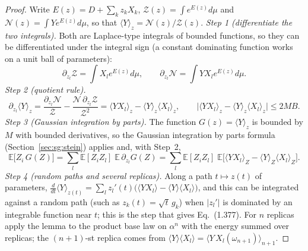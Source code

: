 \begin{proof}
\leanok
Write $E(z)=D+\sum_kz_kX_k$, $\mathcal Z(z)=\int e^{E(z)}d\mu$ and $\mathcal N(z)=\int Y e^{E(z)}d\mu$, so that $\langle Y\rangle_z=\mathcal N(z)/\mathcal Z(z)$.
\emph{Step 1 (differentiate the two integrals).} Both are Laplace-type integrals of bounded functions, so they can be differentiated under the integral sign (a constant dominating function works on a unit ball of parameters):
\[
\partial_{z_l}\mathcal Z=\int X_le^{E(z)}d\mu,\qquad \partial_{z_l}\mathcal N=\int YX_le^{E(z)}d\mu .
\]
\emph{Step 2 (quotient rule).}
\[
\partial_{z_l}\langle Y\rangle_z=\frac{\partial_{z_l}\mathcal N}{\mathcal Z}-\frac{\mathcal N\,\partial_{z_l}\mathcal Z}{\mathcal Z^2}=\langle YX_l\rangle_z-\langle Y\rangle_z\langle X_l\rangle_z,\qquad
\big|\langle YX_l\rangle_z-\langle Y\rangle_z\langle X_l\rangle_z\big|\le2MB .
\]
\emph{Step 3 (Gaussian integration by parts).} The function $G(z)=\langle Y\rangle_z$ is bounded by $M$ with bounded derivatives, so the Gaussian integration by parts formula (Section~\ref{sec:sg:stein}) applies and, with Step~2,
\[
\mathbb E\big[Z_i\,G(Z)\big]=\sum_l\mathbb E[Z_iZ_l]\;\mathbb E\,\partial_{z_l}G(Z)=\sum_l\mathbb E[Z_iZ_l]\;\mathbb E\big[\langle YX_l\rangle_Z-\langle Y\rangle_Z\langle X_l\rangle_Z\big].
\]
\emph{Step 4 (random paths and several replicas).} Along a path $t\mapsto z(t)$ of parameters, $\frac d{dt}\langle Y\rangle_{z(t)}=\sum_lz_l'(t)\big(\langle YX_l\rangle-\langle Y\rangle\langle X_l\rangle\big)$, and this can be integrated against a random path (such as $z_k(t)=\sqrt t\,g_k$) when $|z_l'|$ is dominated by an integrable function near $t$; this is the step that gives Eq.~(1.377). For $n$ replicas apply the lemma to the product base law on $\alpha^n$ with the energy summed over replicas; the $(n+1)$-st replica comes from $\langle Y\rangle\langle X_l\rangle=\langle Y\,X_l(\omega_{n+1})\rangle_{n+1}$.
\end{proof}

